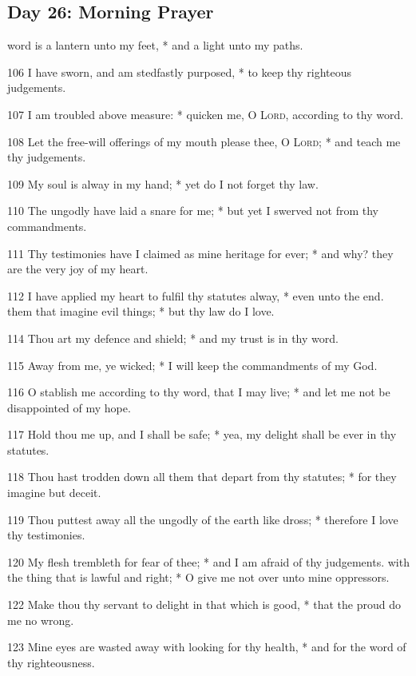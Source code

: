 \subsection{Day 26: Morning Prayer}
 word is a lantern unto my feet, * and a light unto my paths.\par
106 I have sworn, and am stedfastly purposed, * to keep thy righteous judgements.\par
107 I am troubled above measure: * quicken me, O {\textsc{Lord}}, according to thy word.\par
108 Let the free-will offerings of my mouth please thee, O {\textsc{Lord}}; * and teach me thy judgements.\par
109 My soul is alway in my hand; * yet do I not forget thy law.\par
110 The ungodly have laid a snare for me; * but yet I swerved not from thy commandments.\par
111 Thy testimonies have I claimed as mine heritage for ever; * and why? they are the very joy of my heart.\par
112 I have applied my heart to fulfil thy statutes alway, * even unto the end.
 them that imagine evil things; * but thy law do I love.\par
114 Thou art my defence and shield; * and my trust is in thy word.\par
115 Away from me, ye wicked; * I will keep the commandments of my God.\par
116 O stablish me according to thy word, that I may live; * and let me not be disappointed of my hope.\par
117 Hold thou me up, and I shall be safe; * yea, my delight shall be ever in thy statutes.\par
118 Thou hast trodden down all them that depart from thy statutes; * for they imagine but deceit.\par
119 Thou puttest away all the ungodly of the earth like dross; * therefore I love thy testimonies.\par
120 My flesh trembleth for fear of thee; * and I am afraid of thy judgements.
 with the thing that is lawful and right; * O give me not over unto mine oppressors.\par
122 Make thou thy servant to delight in that which is good, * that the proud do me no wrong.\par
123 Mine eyes are wasted away with looking for thy health, * and for the word of thy righteousness.\par
